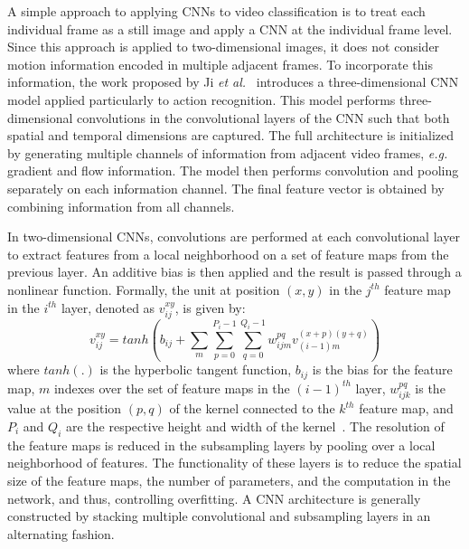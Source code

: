 A simple approach to applying CNNs to video classification is to treat each individual frame as a still image and apply a CNN at the individual frame level. Since this approach is applied to two-dimensional images, it does not consider motion information encoded in multiple adjacent frames. To incorporate this information, the work proposed by Ji \emph{et al.}~\cite{3D-CNN:2013} introduces a three-dimensional CNN model applied particularly to action recognition. This model performs three-dimensional convolutions in the convolutional layers of the CNN such that both spatial and temporal dimensions are captured. The full architecture is initialized by generating multiple channels of information from adjacent video frames, \emph{e.g.} gradient and flow information. The model then performs convolution and pooling separately on each information channel. The final feature vector is obtained by combining information from all channels.

In two-dimensional CNNs, convolutions are performed at each convolutional layer to extract features from a local neighborhood on a set of feature maps from the previous layer. An additive bias is then applied and the result is passed through a nonlinear function. Formally, the unit at position $(x,y)$ in the $j^{th}$ feature map in the $i^{th}$ layer, denoted as $v_{ij}^{xy}$, is given by:
\begin{equation}
  v_{ij}^{xy} = tanh\left( b_{ij} + \sum_{m}\sum_{p=0}^{P_i-1}\sum_{q=0}^{Q_i-1}
    w_{ijm}^{pq}v_{(i-1)m}^{(x+p)(y+q)} \right)
\end{equation}
where $tanh(.)$ is the hyperbolic tangent function, $b_{ij}$ is the bias for the feature map, $m$ indexes over the set of feature maps in the $(i-1)^{th}$ layer, $w_{ijk}^{pq}$ is the value at the position $(p,q)$ of the kernel connected to the $k^{th}$ feature map, and $P_i$ and $Q_i$ are the respective height and width of the kernel~\cite{3D-CNN:2013}. The resolution of the feature maps is reduced in the subsampling layers by pooling over a local neighborhood of features. The functionality of these layers is to reduce the spatial size of the feature maps, the number of parameters, and the computation in the network, and thus, controlling overfitting. A CNN architecture is generally constructed by stacking multiple convolutional and subsampling layers in an alternating fashion.

